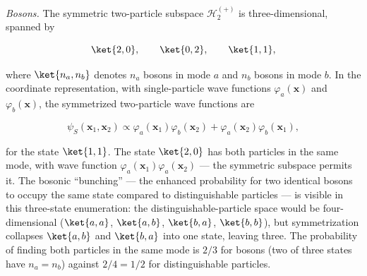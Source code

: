 \textit{Bosons.} The symmetric two-particle subspace $\mathcal{H}_2^{(+)}$ is three-dimensional, spanned by
\begin{linenomath}
    \begin{equation*}
        \ket{2,0},\qquad \ket{0,2},\qquad \ket{1,1},
    \end{equation*}
\end{linenomath}
where $\ket{n_a, n_b}$ denotes $n_a$ bosons in mode $a$ and $n_b$ bosons in mode $b$. In the coordinate representation, with single-particle wave functions $\varphi_a(\bm x)$ and $\varphi_b(\bm x)$, the symmetrized two-particle wave functions are
\begin{linenomath}
    \begin{equation}
        \psi_S(\bm x_1, \bm x_2)
        \propto \varphi_a(\bm x_1)\varphi_b(\bm x_2) + \varphi_a(\bm x_2)\varphi_b(\bm x_1),
        \label{eq:two-particle-symmetrized}
    \end{equation}
\end{linenomath}
for the state $\ket{1,1}$. The state $\ket{2,0}$ has both particles in the same mode, with wave function $\varphi_a(\bm x_1)\varphi_a(\bm x_2)$ --- the symmetric subspace permits it. The bosonic ``bunching'' --- the enhanced probability for two identical bosons to occupy the same state compared to distinguishable particles --- is visible in this three-state enumeration: the distinguishable-particle space would be four-dimensional ($\ket{a,a}$, $\ket{a,b}$, $\ket{b,a}$, $\ket{b,b}$), but symmetrization collapses $\ket{a,b}$ and $\ket{b,a}$ into one state, leaving three. The probability of finding both particles in the same mode is $2/3$ for bosons (two of three states have $n_a=n_b$) against $2/4 = 1/2$ for distinguishable particles.

